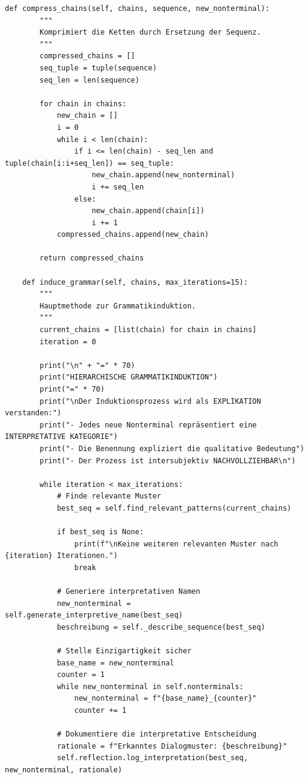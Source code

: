 \documentclass[
  12pt,
  a4paper,
  oneside,
  titlepage
]{article}
\begin{document}
\begin{lstlisting}[caption=Algorithmisch Rekursive Sequenzanalyse 3.0 - Hierarchische Grammatikinduktion]
    def compress_chains(self, chains, sequence, new_nonterminal):
        """
        Komprimiert die Ketten durch Ersetzung der Sequenz.
        """
        compressed_chains = []
        seq_tuple = tuple(sequence)
        seq_len = len(sequence)
        
        for chain in chains:
            new_chain = []
            i = 0
            while i < len(chain):
                if i <= len(chain) - seq_len and tuple(chain[i:i+seq_len]) == seq_tuple:
                    new_chain.append(new_nonterminal)
                    i += seq_len
                else:
                    new_chain.append(chain[i])
                    i += 1
            compressed_chains.append(new_chain)
        
        return compressed_chains
    
    def induce_grammar(self, chains, max_iterations=15):
        """
        Hauptmethode zur Grammatikinduktion.
        """
        current_chains = [list(chain) for chain in chains]
        iteration = 0
        
        print("\n" + "=" * 70)
        print("HIERARCHISCHE GRAMMATIKINDUKTION")
        print("=" * 70)
        print("\nDer Induktionsprozess wird als EXPLIKATION verstanden:")
        print("- Jedes neue Nonterminal repräsentiert eine INTERPRETATIVE KATEGORIE")
        print("- Die Benennung expliziert die qualitative Bedeutung")
        print("- Der Prozess ist intersubjektiv NACHVOLLZIEHBAR\n")
        
        while iteration < max_iterations:
            # Finde relevante Muster
            best_seq = self.find_relevant_patterns(current_chains)
            
            if best_seq is None:
                print(f"\nKeine weiteren relevanten Muster nach {iteration} Iterationen.")
                break
            
            # Generiere interpretativen Namen
            new_nonterminal = self.generate_interpretive_name(best_seq)
            beschreibung = self._describe_sequence(best_seq)
            
            # Stelle Einzigartigkeit sicher
            base_name = new_nonterminal
            counter = 1
            while new_nonterminal in self.nonterminals:
                new_nonterminal = f"{base_name}_{counter}"
                counter += 1
            
            # Dokumentiere die interpretative Entscheidung
            rationale = f"Erkanntes Dialogmuster: {beschreibung}"
            self.reflection.log_interpretation(best_seq, new_nonterminal, rationale)
            

\end{lstlisting}
\end{document}
